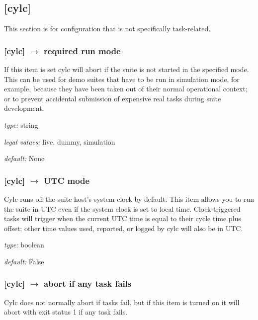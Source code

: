 \subsection{[cylc]}

This section is for configuration that is not specifically task-related.

\subsubsection[required run mode]{ [cylc] $\rightarrow$ required run mode}

If this item is set cylc will abort if the suite is not started in the
specified mode. This can be used for demo suites that have to be
run in simulation mode, for example, because they have been taken out of
their normal operational context; or to prevent accidental submission of
expensive real tasks during suite development. 
\begin{myitemize}
    \item {\em type:} string
    \item {\em legal values:} live, dummy, simulation 
    \item {\em default:} None 
\end{myitemize}

\subsubsection[UTC mode]{ [cylc] $\rightarrow$ UTC mode}

Cylc runs off the suite host's system clock by default. This item allows
you to run the suite in UTC even if the system clock is set to local time.
Clock-triggered tasks will trigger when the current UTC time is equal to
their cycle time plus offset; other time values used, reported, or
logged by cylc will also be in UTC. 

\begin{myitemize}
    \item {\em type:} boolean
    \item {\em default:} False 
\end{myitemize}


\subsubsection[abort if any task fails]{[cylc] $\rightarrow$ abort if any task fails}

Cylc does not normally abort if tasks fail, but if this item is turned
on it will abort with exit status 1 if any task fails.


